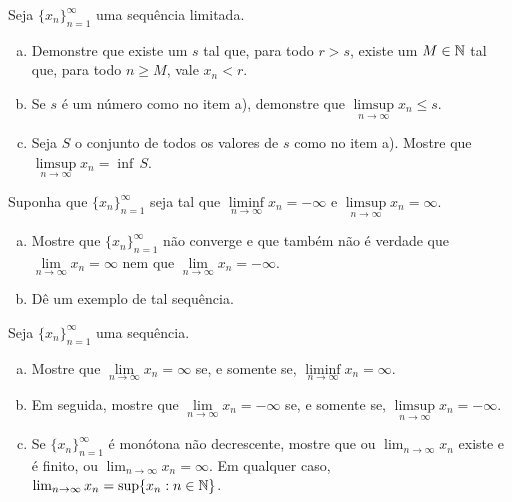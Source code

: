 \begin{exercise}
Seja $\{x_n\}_{n=1}^\infty$ uma sequência limitada.
\begin{enumerate}[a)]
\item
Demonstre que existe um $s$ tal que, para todo $r > s$, existe
um $M \in {\mathbb{N}}$ tal que, para todo $n \geq M$, vale
$x_n < r$.
\item
Se $s$ é um número como no item a), demonstre que $\limsup\limits_{n\to\infty} x_n \leq s$.
\item
Seja $S$ o conjunto de todos os valores de $s$ como no item a). Mostre que
$\limsup\limits_{n\to\infty} x_n = \inf \, S$.
\end{enumerate}
\end{exercise}

\begin{exercise}[Fácil] \label{exercise:infseqlimex}
\pagebreak[2]
Suponha que $\{ x_n \}_{n=1}^\infty$ seja tal que $\liminf\limits_{n\to\infty} x_n = -\infty$
e $\limsup\limits_{n\to\infty} x_n = \infty$.
\begin{enumerate}[a)]
\item
Mostre que $\{ x_n \}_{n=1}^\infty$ não converge e que também não é verdade
que $\lim\limits_{n\to\infty} x_n = \infty$
nem que $\lim\limits_{n\to\infty} x_n = -\infty$.
\item
Dê um exemplo de tal sequência.
\end{enumerate}
\end{exercise}

\begin{exercise} \label{exercise:infseqlimlims}
Seja $\{ x_n \}_{n=1}^\infty$ uma sequência.
\begin{enumerate}[a)]
\item
Mostre que
$\lim\limits_{n\to\infty} x_n = \infty$ se, e somente se,
$\liminf\limits_{n\to\infty} x_n = \infty$.
\item
Em seguida, mostre que $\lim\limits_{n\to\infty} x_n = - \infty$ se, e somente se,
$\limsup\limits_{n\to\infty} x_n = -\infty$.
\item
Se $\{ x_n \}_{n=1}^\infty$ é monótona não decrescente, mostre que ou
$\lim_{n\to\infty} x_n$ existe e é finito, ou $\lim_{n\to\infty} x_n = \infty$. Em qualquer
caso, $\lim_{n\to\infty} x_n = \sup \{ x_n : n \in {\mathbb{N}} \}$.
\end{enumerate}
\end{exercise}

